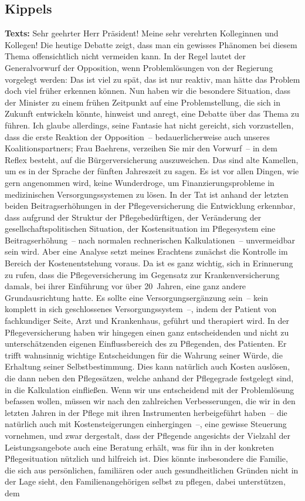 \documentclass{article}
\begin{document}
\subsection{Kippels}
\noindent\textbf{Texts:} Sehr geehrter Herr Präsident! Meine sehr verehrten Kolleginnen und Kollegen! Die heutige Debatte zeigt, dass man ein gewisses Phänomen bei diesem Thema offensichtlich nicht vermeiden kann. In der Regel lautet der Generalvorwurf der Opposition, wenn Problemlösungen von der Regierung vorgelegt werden: Das ist viel zu spät, das ist nur reaktiv, man hätte das Problem doch viel früher erkennen können.  Nun haben wir die besondere Situation, dass der Minister zu einem frühen Zeitpunkt auf eine Problemstellung, die sich in Zukunft entwickeln könnte, hinweist und anregt, eine Debatte über das Thema zu führen. Ich glaube allerdings, seine Fantasie hat nicht gereicht, sich vorzustellen, dass die erste Reaktion der Opposition – bedauerlicherweise auch unseres Koalitionspartners; Frau Baehrens, verzeihen Sie mir den Vorwurf – in dem Reflex besteht, auf die Bürgerversicherung auszuweichen. Das sind alte Kamellen, um es in der Sprache der fünften Jahreszeit zu sagen. Es ist vor allen Dingen, wie gern angenommen wird, keine Wunderdroge, um Finanzierungsprobleme in medizinischen Versorgungssystemen zu lösen.  In der Tat ist anhand der letzten beiden Beitragserhöhungen in der Pflegeversicherung die Entwicklung erkennbar, dass aufgrund der Struktur der Pflegebedürftigen, der Veränderung der gesellschaftspolitischen Situation, der Kostensituation im Pflegesystem eine Beitragserhöhung – nach normalen rechnerischen Kalkulationen – unvermeidbar sein wird. Aber eine Analyse setzt meines Erachtens zunächst die Kontrolle im Bereich der Kostenentstehung voraus. Da ist es ganz wichtig, sich in Erinnerung zu rufen, dass die Pflegeversicherung im Gegensatz zur Krankenversicherung damals, bei ihrer Einführung vor über 20 Jahren, eine ganz andere Grundausrichtung hatte. Es sollte eine Versorgungsergänzung sein – kein komplett in sich geschlossenes Versorgungssystem –, indem der Patient von fachkundiger Seite, Arzt und Krankenhaus, geführt und therapiert wird. In der Pflegeversicherung haben wir hingegen einen ganz entscheidenden und nicht zu unterschätzenden eigenen Einflussbereich des zu Pflegenden, des Patienten. Er trifft wahnsinnig wichtige Entscheidungen für die Wahrung seiner Würde, die Erhaltung seiner Selbstbestimmung. Dies kann natürlich auch Kosten auslösen, die dann neben den Pflegesätzen, welche anhand der Pflegegrade festgelegt sind, in die Kalkulation einfließen.  Wenn wir uns entscheidend mit der Problemlösung befassen wollen, müssen wir nach den zahlreichen Verbesserungen, die wir in den letzten Jahren in der Pflege mit ihren Instrumenten herbeigeführt haben – die natürlich auch mit Kostensteigerungen einhergingen –, eine gewisse Steuerung vornehmen, und zwar dergestalt, dass der Pflegende angesichts der Vielzahl der Leistungsangebote auch eine Beratung erhält, was für ihn in der konkreten Pflegesituation nützlich und hilfreich ist. Dies könnte insbesondere die Familie, die sich aus persönlichen, familiären oder auch gesundheitlichen Gründen nicht in der Lage sieht, den Familienangehörigen selbst zu pflegen, dabei unterstützen, dem 
\end{document}
